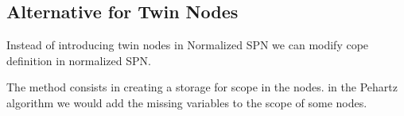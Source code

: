 \subsection{Alternative for Twin Nodes}

Instead of introducing twin nodes in Normalized SPN we can modify cope definition in normalized SPN.

The method consists in creating a storage for scope in the nodes.
in the Pehartz algorithm we would add the missing variables to the scope of some nodes.